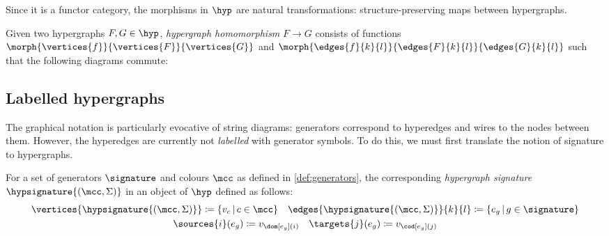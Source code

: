 Since it is a functor category, the morphisms in \(\hyp\) are natural
transformations: structure-preserving maps between hypergraphs.

\begin{definition}
    Given two hypergraphs \(F, G \in \hyp\), \emph{hypergraph homomorphism}
    \(F \to G\) consists of functions
    \(\morph{\vertices{f}}{\vertices{F}}{\vertices{G}}\) and
    \(\morph{\edges{f}{k}{l}}{\edges{F}{k}{l}}{\edges{G}{k}{l}}\) such that the
    following diagrams commute:
    
\end{definition}

\subsection{Labelled hypergraphs}

The graphical notation is particularly evocative of string diagrams: generators
correspond to hyperedges and wires to the nodes between them.
However, the hyperedges are currently not \emph{labelled} with generator
symbols.
To do this, we must first translate the notion of signature to hypergraphs.

\begin{definition}
    For a set of generators \(\signature\) and colours \(\mcc\) as defined
    in \cref{def:generators}, the corresponding \emph{hypergraph signature}
    \(\hypsignature{(\mcc,\Sigma)}\) in an object of \(\hyp\) defined as
    follows:
    \begin{gather*}
        \vertices{\hypsignature{(\mcc,\Sigma)}} \coloneqq \{ v_c \,|\, c \in \mcc\}
        \quad
        \edges{\hypsignature{(\mcc,\Sigma)}}{k}{l} \coloneqq \{ e_g \,|\, g \in \signature\}
        \\
        \sources{i}(e_g) \coloneqq v_{\dom[e_g](i)}
        \quad
        \targets{j}(e_g) \coloneqq v_{\cod[e_g](j)}
    \end{gather*}
\end{definition}


